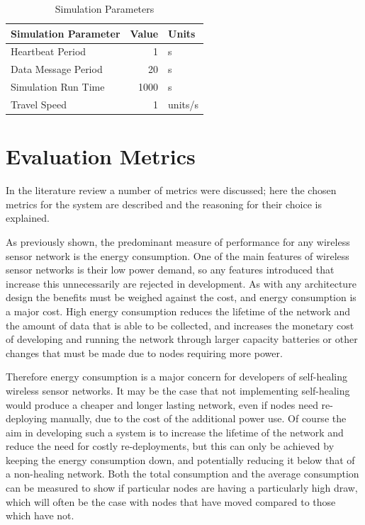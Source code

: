 \documentclass[authoryearcitations]{UoYCSproject}
\begin{document}
\begin{table}[]
\centering
\begin{tabular}{@{}lrl@{}}
\toprule
Simulation Parameter     & Value & Units   \\ \midrule
Heartbeat Period         & 1     & s       \\
Data Message Period      & 20    & s       \\
Simulation Run Time      & 1000  & s       \\
Travel Speed             & 1     & units/s \\ \bottomrule
\end{tabular}
\caption{Simulation Parameters}
\label{tab:simParams}
\end{table}

\section{Evaluation Metrics}

In the literature review a number of metrics were discussed; here the chosen metrics for the system are described and the reasoning for their choice is explained.

As previously shown, the predominant measure of performance for any wireless sensor network is the energy consumption. One of the main features of wireless sensor networks is their low power demand, so any features introduced that increase this unnecessarily are rejected in development. As with any architecture design the benefits must be weighed against the cost, and energy consumption is a major cost. High energy consumption reduces the lifetime of the network and the amount of data that is able to be collected, and increases the monetary cost of developing and running the network through larger capacity batteries or other changes that must be made due to nodes requiring more power.

Therefore energy consumption is a major concern for developers of self-healing wireless sensor networks. It may be the case that not implementing self-healing would produce a cheaper and longer lasting network, even if nodes need re-deploying manually, due to the cost of the additional power use. Of course the aim in developing such a system is to increase the lifetime of the network and reduce the need for costly re-deployments, but this can only be achieved by keeping the energy consumption down, and potentially reducing it below that of a non-healing network. Both the total consumption and the average consumption can be measured to show if particular nodes are having a particularly high draw, which will often be the case with nodes that have moved compared to those which have not.
\end{document}
